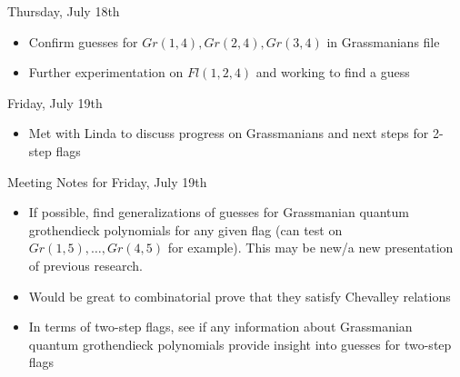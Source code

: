 Thursday, July 18th
\begin{itemize}
    \item Confirm guesses for $Gr(1, 4), Gr(2, 4), Gr(3, 4)$ in Grassmanians file
    \item Further experimentation on $Fl(1, 2, 4)$ and working to find a guess
\end{itemize}

Friday, July 19th
\begin{itemize}
    \item Met with Linda to discuss progress on Grassmanians and next steps for 2-step flags
\end{itemize}

Meeting Notes for Friday, July 19th
\begin{itemize}
    \item If possible, find generalizations of guesses for Grassmanian quantum grothendieck polynomials for any given flag (can test on $Gr(1, 5), \dots, Gr(4, 5)$ for example). This may be new/a new presentation of previous research.
    \item Would be great to combinatorial prove that they satisfy Chevalley relations 
    \item In terms of two-step flags, see if any information about Grassmanian quantum grothendieck polynomials provide insight into guesses for two-step flags
\end{itemize}